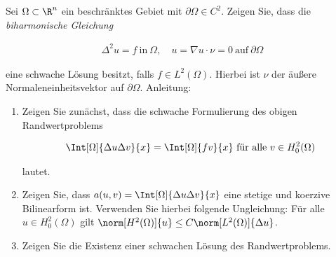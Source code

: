 
\begin{exercise}

Sei $\Omega \subset \R^n$ ein beschränktes Gebiet mit $\partial\Omega \in C^2$.
Zeigen Sie, dass die \textit{biharmonische Gleichung}

\begin{align*}
  \Delta^2 u = f ~\text{in}~ \Omega,
  \quad
  u = \nabla u \cdot \nu = 0 ~\text{auf}~ \partial \Omega
\end{align*}

eine schwache Lösung besitzt, falls $f \in L^2(\Omega)$.
Hierbei ist $\nu$ der äußere Normaleneinheitsvektor auf $\partial\Omega$.
Anleitung:

\begin{enumerate}[label = (\alph*)]

  \item Zeigen Sie zunächst, dass die schwache Formulierung des obigen Randwertproblems

  \begin{align*}
    \Int[\Omega]{\Delta u \Delta v}{x} = \Int[\Omega]{f v}{x}
    ~\text{für alle}~ v \in H_0^2(\Omega)
  \end{align*}

  lautet.

  \item Zeigen Sie, dass $a(u, v) = \Int[\Omega]{\Delta u \Delta v}{x}$ eine stetige und koerzive Bilinearform ist.
  Verwenden Sie hierbei folgende Ungleichung:
  Für alle $u \in H_0^2(\Omega)$ gilt $\norm[H^2(\Omega)]{u} \leq C \norm[L^2(\Omega)]{\Delta u}$.

  \item Zeigen Sie die Existenz einer schwachen Lösung des Randwertproblems.

\end{enumerate}

\end{exercise}


